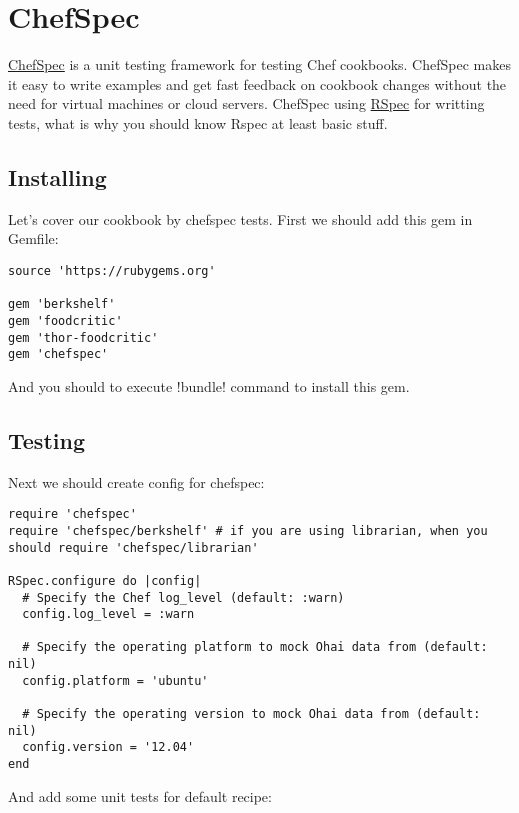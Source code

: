 \section{ChefSpec}
\label{sec:testing-chefspec}

\href{http://code.sethvargo.com/chefspec/}{ChefSpec} is a unit testing framework for testing Chef cookbooks. ChefSpec makes it easy to write examples and get fast feedback on cookbook changes without the need for virtual machines or cloud servers. ChefSpec using \href{http://rspec.info/}{RSpec} for writting tests, what is why you should know Rspec at least basic stuff.

\subsection{Installing}

Let's cover our cookbook by chefspec tests. First we should add this gem in Gemfile:

\begin{lstlisting}[label=lst:testing-chefspec1]
source 'https://rubygems.org'

gem 'berkshelf'
gem 'foodcritic'
gem 'thor-foodcritic'
gem 'chefspec'
\end{lstlisting}

And you should to execute \inline!bundle! command to install this gem.

\subsection{Testing}

Next we should create config for chefspec:

\begin{lstlisting}[label=lst:testing-chefspec2,title=my-server-cloud/site-cookbooks/my\_cool\_app/spec/spec\_helper.rb]
require 'chefspec'
require 'chefspec/berkshelf' # if you are using librarian, when you should require 'chefspec/librarian'

RSpec.configure do |config|
  # Specify the Chef log_level (default: :warn)
  config.log_level = :warn

  # Specify the operating platform to mock Ohai data from (default: nil)
  config.platform = 'ubuntu'

  # Specify the operating version to mock Ohai data from (default: nil)
  config.version = '12.04'
end
\end{lstlisting}

And add some unit tests for default recipe:

